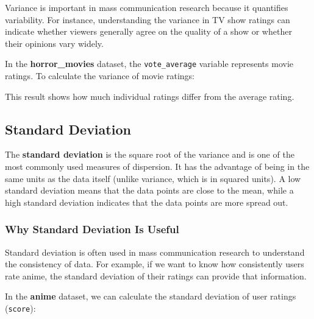 \documentclass[
]{book}
\newenvironment{Shaded}{\begin{snugshade}}{\end{snugshade}}
\newcommand{\AttributeTok}[1]{\textcolor[rgb]{0.13,0.29,0.53}{#1}}
\newcommand{\CommentTok}[1]{\textcolor[rgb]{0.56,0.35,0.01}{\textit{#1}}}
\newcommand{\ConstantTok}[1]{\textcolor[rgb]{0.56,0.35,0.01}{#1}}
\newcommand{\FunctionTok}[1]{\textcolor[rgb]{0.13,0.29,0.53}{\textbf{#1}}}
\newcommand{\NormalTok}[1]{#1}
\newcommand{\OtherTok}[1]{\textcolor[rgb]{0.56,0.35,0.01}{#1}}
\newcommand{\SpecialCharTok}[1]{\textcolor[rgb]{0.81,0.36,0.00}{\textbf{#1}}}
\begin{document}
Variance is important in mass communication research because it quantifies variability. For instance, understanding the variance in TV show ratings can indicate whether viewers generally agree on the quality of a show or whether their opinions vary widely.

In the \textbf{horror\_movies} dataset, the \texttt{vote\_average} variable represents movie ratings. To calculate the variance of movie ratings:

\begin{Shaded}
\end{Shaded}

This result shows how much individual ratings differ from the average rating.

\subsection*{Standard Deviation}\label{standard-deviation}

The \textbf{standard deviation} is the square root of the variance and is one of the most commonly used measures of dispersion. It has the advantage of being in the same units as the data itself (unlike variance, which is in squared units). A low standard deviation means that the data points are close to the mean, while a high standard deviation indicates that the data points are more spread out.

\subsubsection*{Why Standard Deviation Is Useful}\label{why-standard-deviation-is-useful}

Standard deviation is often used in mass communication research to understand the consistency of data. For example, if we want to know how consistently users rate anime, the standard deviation of their ratings can provide that information.

In the \textbf{anime} dataset, we can calculate the standard deviation of user ratings (\texttt{score}):
\end{document}
